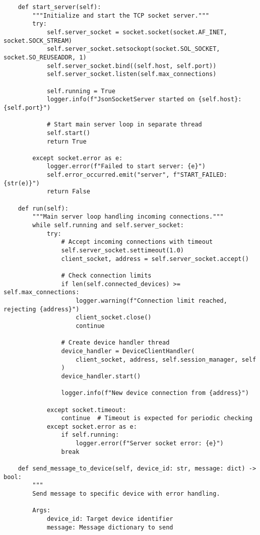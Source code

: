 \documentclass[12pt,a4paper]{article}
\begin{document}
\begin{verbatim}
    def start_server(self):
        """Initialize and start the TCP socket server."""
        try:
            self.server_socket = socket.socket(socket.AF_INET, socket.SOCK_STREAM)
            self.server_socket.setsockopt(socket.SOL_SOCKET, socket.SO_REUSEADDR, 1)
            self.server_socket.bind((self.host, self.port))
            self.server_socket.listen(self.max_connections)

            self.running = True
            logger.info(f"JsonSocketServer started on {self.host}:{self.port}")

            # Start main server loop in separate thread
            self.start()
            return True

        except socket.error as e:
            logger.error(f"Failed to start server: {e}")
            self.error_occurred.emit("server", f"START_FAILED: {str(e)}")
            return False

    def run(self):
        """Main server loop handling incoming connections."""
        while self.running and self.server_socket:
            try:
                # Accept incoming connections with timeout
                self.server_socket.settimeout(1.0)
                client_socket, address = self.server_socket.accept()

                # Check connection limits
                if len(self.connected_devices) >= self.max_connections:
                    logger.warning(f"Connection limit reached, rejecting {address}")
                    client_socket.close()
                    continue

                # Create device handler thread
                device_handler = DeviceClientHandler(
                    client_socket, address, self.session_manager, self
                )
                device_handler.start()

                logger.info(f"New device connection from {address}")

            except socket.timeout:
                continue  # Timeout is expected for periodic checking
            except socket.error as e:
                if self.running:
                    logger.error(f"Server socket error: {e}")
                break

    def send_message_to_device(self, device_id: str, message: dict) -> bool:
        """
        Send message to specific device with error handling.
        
        Args:
            device_id: Target device identifier
            message: Message dictionary to send
            

\end{verbatim}
\end{document}
